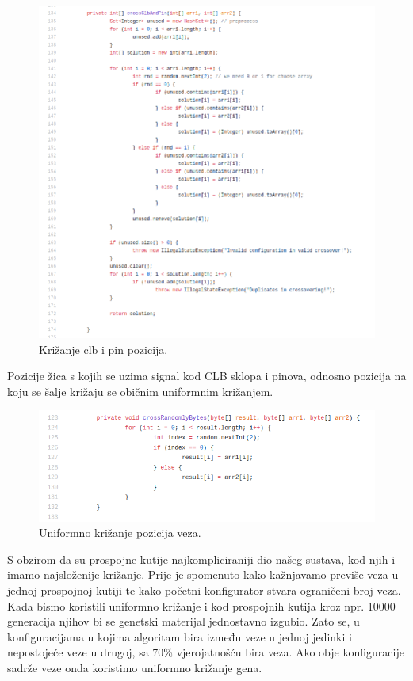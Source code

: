 \documentclass[times, utf8, zavrsni]{fer}
\begin{document}
	
	\begin{figure}[H]
		\centering
		\includegraphics[width=18cm]{slike/crossClbAndPin.png}
		\caption{Križanje clb i pin pozicija.}
		\label{fig:clb-and-pin-positions}
	\end{figure} 
	
	Pozicije žica s kojih se uzima signal kod CLB sklopa i pinova, odnosno pozicija na koju se šalje križaju se običnim uniformnim križanjem. 
	
	\begin{figure}[H]
		\centering
		\includegraphics[width=18cm]{slike/crossRandomlyBytes.png}
		\caption{Uniformno križanje pozicija veza.}
		\label{fig:uniform-connection-crossing}
	\end{figure} 
	
	S obzirom da su prospojne kutije najkompliciraniji dio našeg sustava, kod njih i imamo najsloženije križanje. Prije je spomenuto kako kažnjavamo previše veza u jednoj prospojnoj kutiji te kako početni konfigurator stvara ograničeni broj veza. Kada bismo koristili uniformno križanje i kod prospojnih kutija kroz npr. 10000 generacija njihov bi se genetski materijal jednostavno izgubio. Zato se, u konfiguracijama u kojima algoritam bira između veze u jednoj jedinki i nepostojeće veze u drugoj, sa 70\% vjerojatnošću bira veza. Ako obje konfiguracije sadrže veze onda koristimo uniformno križanje gena. 
	
\end{document}
